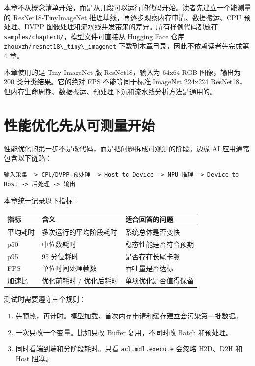 本章不从概念清单开始，而是从几段可以运行的代码开始。读者先建立一个能测量的
ResNet18-TinyImageNet 推理基线，再逐步观察内存申请、数据搬运、CPU
预处理、DVPP 图像处理和流水线并发带来的差异。所有样例代码都放在
\passthrough{\lstinline!samples/chapter8/!}，模型文件可直接从 Hugging
Face 仓库 \passthrough{\lstinline!zhouxzh/resnet18\_tiny\_imagenet!}
下载到本章目录，因此不依赖读者先完成第 4 章。

本章使用的是 Tiny-ImageNet 版 ResNet18，输入为 64x64 RGB 图像，输出为
200 类分类结果。它的绝对 FPS 不能等同于标准 ImageNet 224x224
ResNet18，但内存生命周期、数据搬运、预处理下沉和流水线分析方法是通用的。

\section{性能优化先从可测量开始}\label{src-book-chapter8-h1}

性能优化的第一步不是改代码，而是把问题拆成可观测的阶段。边缘 AI
应用通常包含以下链路：

\begin{lstlisting}
输入采集 -> CPU/DVPP 预处理 -> Host to Device -> NPU 推理 -> Device to Host -> 后处理 -> 输出
\end{lstlisting}

本章统一记录以下指标：

\begin{longtable}[]{@{}lll@{}}
\toprule\noalign{}
指标 & 含义 & 适合回答的问题 \\
\midrule\noalign{}
\endhead
\bottomrule\noalign{}
\endlastfoot
平均耗时 & 多次运行的平均阶段耗时 & 系统总体是否变快 \\
p50 & 中位数耗时 & 稳态性能是否符合预期 \\
p95 & 95 分位耗时 & 是否存在长尾卡顿 \\
FPS & 单位时间处理帧数 & 吞吐量是否达标 \\
加速比 & 优化前耗时 / 优化后耗时 & 单项优化是否值得保留 \\
\end{longtable}

测试时需要遵守三个规则：

\begin{enumerate}
\def\labelenumi{\arabic{enumi}.}
\tightlist
\item
  先预热，再计时。模型加载、首次内存申请和缓存建立会污染第一批数据。
\item
  一次只改一个变量。比如只改 Buffer 复用，不同时改 Batch 和预处理。
\item
  同时看端到端和分阶段耗时。只看
  \passthrough{\lstinline!acl.mdl.execute!} 会忽略 H2D、D2H 和 Host
  阻塞。
\end{enumerate}

